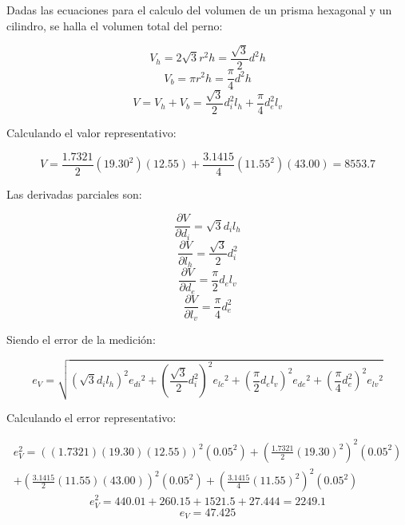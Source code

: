 \documentclass[letter,11pt]{article}
\begin{document}
Dadas las ecuaciones para el calculo del volumen de un prisma hexagonal y un
cilindro, se halla el volumen total del perno:

\begin{equation}
    V_h = 2\sqrt{3} r^2 h = \frac{\sqrt{3}}{2} d^2 h
\tag{prisma}
\end{equation}
\begin{equation}
    V_b = \pi r^2 h = \frac{\pi}{4} d^2 h
\tag{cilindro}
\end{equation}
\begin{equation}
    V = V_h + V_b = \frac{\sqrt{3}}{2} d_i^2 l_h + \frac{\pi}{4} d_e^2 l_v
\end{equation}

Calculando el valor representativo:

\begin{equation*}
    V = \frac{1.7321}{2}(19.30^2)(12.55)+\frac{3.1415}{4}(11.55^2)(43.00)=8553.7
\end{equation*}

Las derivadas parciales son:

\begin{equation}
    \frac{\partial{V}}{\partial{d_i}} = \sqrt{3} d_i l_h
\end{equation}
\begin{equation}
    \frac{\partial{V}}{\partial{l_h}} = \frac{\sqrt{3}}{2} d_i^2
\end{equation}
\begin{equation}
    \frac{\partial{V}}{\partial{d_e}} = \frac{\pi}{2} d_e l_v
\end{equation}
\begin{equation}
    \frac{\partial{V}}{\partial{l_v}} = \frac{\pi}{4} d_e^2
\end{equation}

Siendo el error de la medición:

\begin{equation}
    e_V = \sqrt{
        \left(\sqrt{3}d_il_h\right)^2{e_{di}}^2+
        \left(\frac{\sqrt{3}}{2}d_i^2\right)^2{e_{lc}}^2+
        \left(\frac{\pi}{2}d_el_v\right)^2{e_{de}}^2+
        \left(\frac{\pi}{4}d_e^2\right)^2{e_{lv}}^2
    }
\end{equation}

Calculando el error representativo:

\begin{equation*}
\begin{split}
    e_V^2 = 
        \left((1.7321)(19.30)(12.55)\right)^2(0.05^2)+
        \left(\frac{1.7321}{2}(19.30)^2\right)^2(0.05^2)\\
        +\left(\frac{3.1415}{2}(11.55)(43.00)\right)^2(0.05^2)+
        \left(\frac{3.1415}{4}(11.55)^2\right)^2(0.05^2)
\end{split}
\end{equation*}
\begin{equation*}
    e_V^2 = 440.01 + 260.15 + 1521.5 + 27.444 = 2249.1 
\end{equation*}
\begin{equation*}
    e_V = 47.425
\end{equation*}
\end{document}

